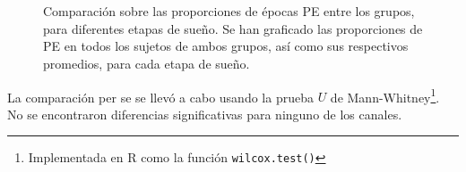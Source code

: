 \begin{figure}
\centering
{}\\
\\
\caption{Comparaci\'on sobre las proporciones de \'epocas PE entre los grupos, para diferentes
etapas de sue\~no. Se han graficado las proporciones de PE en todos los sujetos de ambos grupos,
as\'i como sus respectivos promedios, para cada etapa de sue\~no.}
\label{comparacion_graf}
\end{figure}

La comparaci\'on per se se llev\'o a cabo usando la prueba %
$U$ de Mann-Whitney\footnote{Implementada en R como la funci\'on \texttt{wilcox.test()}}.
No se encontraron diferencias significativas para ninguno de los canales.


